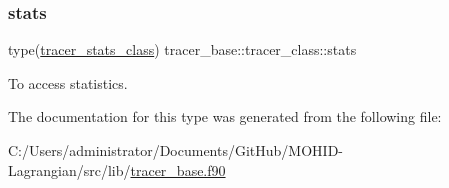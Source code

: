 \subsubsection{\texorpdfstring{stats}{stats}}
{\footnotesize\ttfamily type(\mbox{\hyperlink{structtracer__base_1_1tracer__stats__class}{tracer\+\_\+stats\+\_\+class}}) tracer\+\_\+base\+::tracer\+\_\+class\+::stats\hspace{0.3cm}{\ttfamily [private]}}



To access statistics. 



The documentation for this type was generated from the following file\+:\begin{DoxyCompactItemize}
\item 
C\+:/\+Users/administrator/\+Documents/\+Git\+Hub/\+M\+O\+H\+I\+D-\/\+Lagrangian/src/lib/\mbox{\hyperlink{tracer__base_8f90}{tracer\+\_\+base.\+f90}}\end{DoxyCompactItemize}
